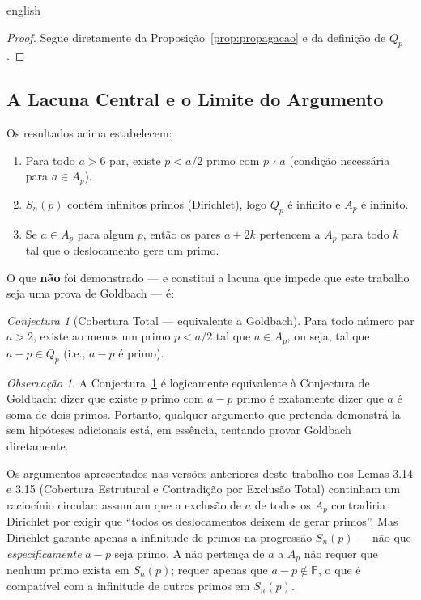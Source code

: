 \documentclass[a4paper,11pt]{article}
\theoremstyle{definition}
\theoremstyle{remark}
\newtheorem{remark}[theorem]{Observação}
\newtheorem{conjecture}{Conjectura}
\begin{document}
\begin{otherlanguage*}{english}
		\begin{proof}
			Segue diretamente da Proposição~\ref{prop:propagacao} e da definição de
			$Q_p$.
		\end{proof}
		
		\subsection{A Lacuna Central e o Limite do Argumento}\label{sec:lacuna}
		
		Os resultados acima estabelecem:
		\begin{enumerate}
			\item Para todo $a > 6$ par, existe $p < a/2$ primo com $p \nmid a$
			(condição necessária para $a \in A_p$).
			\item $S_n(p)$ contém infinitos primos (Dirichlet), logo $Q_p$ é infinito
			e $A_p$ é infinito.
			\item Se $a \in A_p$ para algum $p$, então os pares $a \pm 2k$ pertencem
			a $A_p$ para todo $k$ tal que o deslocamento gere um primo.
		\end{enumerate}
		
		O que \textbf{não} foi demonstrado — e constitui a lacuna que impede que
		este trabalho seja uma prova de Goldbach — é:
		
		\begin{conjecture}[Cobertura Total — equivalente a Goldbach]\label{conj:cobertura}
			Para todo número par $a > 2$, existe ao menos um primo $p < a/2$ tal que
			$a \in A_p$, ou seja, tal que $a - p \in Q_p$ (i.e., $a - p$ é primo).
		\end{conjecture}
		
		\begin{remark}
			A Conjectura~\ref{conj:cobertura} é logicamente equivalente à Conjectura
			de Goldbach: dizer que existe $p$ primo com $a - p$ primo é exatamente
			dizer que $a$ é soma de dois primos. Portanto, qualquer argumento que
			pretenda demonstrá-la sem hipóteses adicionais está, em essência,
			tentando provar Goldbach diretamente.
		\end{remark}
		
		Os argumentos apresentados nas versões anteriores deste trabalho nos Lemas
		3.14 e 3.15 (Cobertura Estrutural e Contradição por Exclusão Total)
		continham um raciocínio circular: assumiam que a exclusão de $a$ de todos
		os $A_p$ contradiria Dirichlet por exigir que ``todos os deslocamentos
		deixem de gerar primos''. Mas Dirichlet garante apenas a infinitude de
		primos na progressão $S_n(p)$ — não que \emph{especificamente} $a - p$
		seja primo. A não pertença de $a$ a $A_p$ não requer que nenhum primo
		exista em $S_n(p)$; requer apenas que $a - p \notin \mathbb{P}$, o que é
		compatível com a infinitude de outros primos em $S_n(p)$.
		

\end{otherlanguage*}
\end{document}
